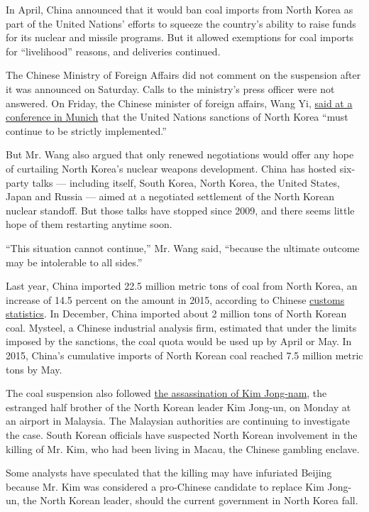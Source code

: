 In April, China announced that it would ban coal imports from North
Korea as part of the United Nations' efforts to squeeze the country's
ability to raise funds for its nuclear and missile programs. But it
allowed exemptions for coal imports for ``livelihood'' reasons, and
deliveries continued.

The Chinese Ministry of Foreign Affairs did not comment on the
suspension after it was announced on Saturday. Calls to the ministry's
press officer were not answered. On Friday, the Chinese minister of
foreign affairs, Wang Yi,
\href{http://www.mfa.gov.cn/web/zyxw/t1439593.shtml}{said at a
conference in Munich} that the United Nations sanctions of North Korea
``must continue to be strictly implemented.''

But Mr. Wang also argued that only renewed negotiations would offer any
hope of curtailing North Korea's nuclear weapons development. China has
hosted six-party talks --- including itself, South Korea, North Korea,
the United States, Japan and Russia --- aimed at a negotiated settlement
of the North Korean nuclear standoff. But those talks have stopped since
2009, and there seems little hope of them restarting anytime soon.

``This situation cannot continue,'' Mr. Wang said, ``because the
ultimate outcome may be intolerable to all sides.''

Last year, China imported 22.5 million metric tons of coal from North
Korea, an increase of 14.5 percent on the amount in 2015, according to
Chinese \href{http://www.sxcoal.com/news/4551922/info}{customs
statistics}. In December, China imported about 2 million tons of North
Korean coal. Mysteel, a Chinese industrial analysis firm, estimated that
under the limits imposed by the sanctions, the coal quota would be used
up by April or May. In 2015, China's cumulative imports of North Korean
coal reached 7.5 million metric tons by May.

The coal suspension also followed
\href{https://www.nytimes.com/2017/02/14/world/asia/kim-jong-un-brother-killed-malaysia.html}{the
assassination of Kim Jong-nam}, the estranged half brother of the North
Korean leader Kim Jong-un, on Monday at an airport in Malaysia. The
Malaysian authorities are continuing to investigate the case. South
Korean officials have suspected North Korean involvement in the killing
of Mr. Kim, who had been living in Macau, the Chinese gambling enclave.

Some analysts have speculated that the killing may have infuriated
Beijing because Mr. Kim was considered a pro-Chinese candidate to
replace Kim Jong-un, the North Korean leader, should the current
government in North Korea fall.

